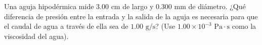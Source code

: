 \item Una aguja hipodérmica mide $3.00 \text{ cm}$ de largo y $0.300 \text{ mm}$ de diámetro. ¿Qué diferencia de presión entre la entrada y la salida de la aguja es necesaria para que el caudal de agua a través de ella sea de $1.00 \text{ g/s}$? (Use $1.00 \times 10^{-3} \text{ Pa}\cdot\text{s}$ como la viscosidad del agua).
